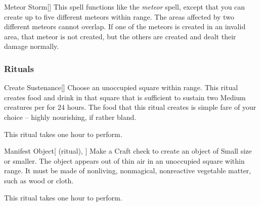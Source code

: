 \lowercase{\hypertarget{spell:Meteor Storm}{}}\label{spell:Meteor Storm}
\begin{freeability}[\nth{6}]{\hypertarget{spell:Meteor Storm}{Meteor Storm}}[]
This spell functions like the \textit{meteor} spell, except that you can create up to five different meteors within \rnglong range.
The areas affected by two different meteors cannot overlap.
If one of the meteors is created in an invalid area, that meteor is not created, but the others are created and dealt their damage normally.
\end{freeability}
\vspace{0.25em}



\subsubsection{Rituals}


\lowercase{\hypertarget{spell:Create Sustenance}{}}\label{spell:Create Sustenance}
\begin{freeability}[\nth{2}]{\hypertarget{spell:Create Sustenance}{Create Sustenance}}[]
Choose an unoccupied square within \rngclose range.
This ritual creates food and drink in that square that is sufficient to sustain two Medium creatures per  for 24 hours.
The food that this ritual creates is simple fare of your choice -- highly nourishing, if rather bland.

This ritual takes one hour to perform.
\end{freeability}
\vspace{0.25em}



\lowercase{\hypertarget{spell:Manifest Object}{}}\label{spell:Manifest Object}
\begin{attuneability}[\nth{2}]{\hypertarget{spell:Manifest Object}{Manifest Object}}[ (ritual), ]
Make a Craft check to create an object of Small size or smaller.
The object appears out of thin air in an unoccupied square within \rngclose range.
It must be made of nonliving, nonmagical, nonreactive vegetable matter, such as wood or cloth.

This ritual takes one hour to perform.
\end{attuneability}
\vspace{0.25em}


